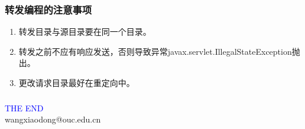 \begin{frame}[fragile] %
\frametitle{转发编程的注意事项} 

\begin{enumerate}
\item 转发目录与源目录要在同一个目录。
\item 转发之前不应有响应发送，否则导致异常javax.servlet.IllegalStateException抛出。
\item 更改请求目录最好在重定向中。
\end{enumerate}

\end{frame}
\begin{frame}[fragile] %
\frametitle{} 

\end{frame}
\begin{frame}
\centering
{\Huge \textcolor{blue}{THE END}} \\
\vspace{5mm}
{\Large wangxiaodong@ouc.edu.cn} \\
\end{frame}

